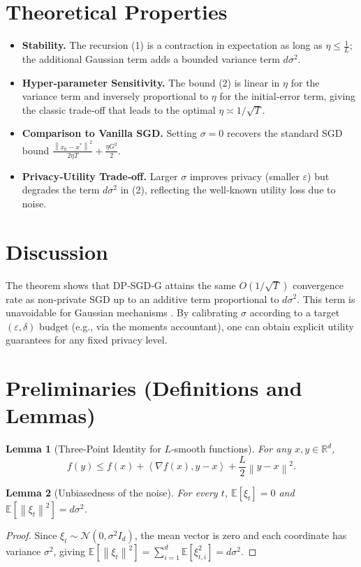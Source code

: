 \documentclass{article}
\newtheorem{lemma}{Lemma}
\newcommand{\EE}{\mathbb{E}}
\newcommand{\RR}{\mathbb{R}}
\newcommand{\norm}[1]{\left\lVert #1 \right\rVert}
\newcommand{\inner}[2]{\left\langle #1,#2 \right\rangle}
\begin{document}
\section*{Theoretical Properties}
\begin{itemize}[leftmargin=*]
\item \textbf{Stability.} The recursion (1) is a contraction in expectation as long as $\eta\le \tfrac{1}{L}$; the additional Gaussian term adds a bounded variance term $d\sigma^{2}$.
\item \textbf{Hyper‑parameter Sensitivity.} The bound (2) is linear in $\eta$ for the variance term and inversely proportional to $\eta$ for the initial‑error term, giving the classic trade‑off that leads to the optimal $\eta\asymp 1/\sqrt{T}$.
\item \textbf{Comparison to Vanilla SGD.} Setting $\sigma=0$ recovers the standard SGD bound $\frac{\norm{x_{0}-x^{\ast}}^{2}}{2\eta T}+\frac{\eta G^{2}}{2}$.
\item \textbf{Privacy‑Utility Trade‑off.} Larger $\sigma$ improves privacy (smaller $\varepsilon$) but degrades the term $d\sigma^{2}$ in (2), reflecting the well‑known utility loss due to noise.
\end{itemize}

\section*{Discussion}
The theorem shows that DP‑SGD‑G attains the same $O(1/\sqrt{T})$ convergence rate as non‑private SGD up to an additive term proportional to $d\sigma^{2}$. This term is unavoidable for Gaussian mechanisms \cite{dwork2014algorithmic}. By calibrating $\sigma$ according to a target $(\varepsilon,\delta)$ budget (e.g., via the moments accountant), one can obtain explicit utility guarantees for any fixed privacy level.

\newpage
\section*{Preliminaries (Definitions and Lemmas)}
\begin{lemma}[Three‑Point Identity for $L$‑smooth functions]\label{lem:three}
For any $x,y\in\RR^{d}$,
\[
f(y)\le f(x)+\inner{\nabla f(x)}{y-x}+\frac{L}{2}\norm{y-x}^{2}.
\tag{L1}
\]
\end{lemma}
\begin{lemma}[Unbiasedness of the noise]\label{lem:noise}
For every $t$, $\EE[\xi_{t}]=0$ and $\EE[\norm{\xi_{t}}^{2}]=d\sigma^{2}$.
\end{lemma}
\begin{proof}
Since $\xi_{t}\sim\mathcal{N}(0,\sigma^{2}I_{d})$, the mean vector is zero and each coordinate has variance $\sigma^{2}$, giving $\EE[\norm{\xi_{t}}^{2}]=\sum_{i=1}^{d}\EE[\xi_{t,i}^{2}]=d\sigma^{2}$.
\end{proof}
\end{document}

